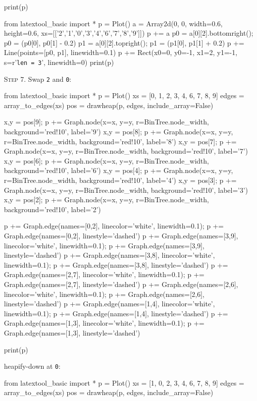 print(p)

from latextool_basic import *
p = Plot()
a = Array2d(0, 0, width=0.6, height=0.6, 
             xs=[['2','1','0','3','4','6','7','8','9']])
p += a
p0 = a[0][2].bottomright(); p0 = (p0[0], p0[1] - 0.2)
p1 = a[0][2].topright(); p1 = (p1[0], p1[1] + 0.2)
p += Line(points=[p0, p1], linewidth=0.1)
p += Rect(x0=0, y0=-1, x1=2, y1=-1, s=r'\texttt{len = 3}', linewidth=0) 
print(p)


\textsc{Step 7}.
Swap \texttt{2} and \texttt{0}:


from latextool_basic import *
p = Plot()
xs = [0, 1, 2, 3, 4, 6, 7, 8, 9]
edges = array_to_edges(xs)
pos = drawheap(p, edges, include_array=False)

x,y = pos[9]; p += Graph.node(x=x, y=y, r=BinTree.node_width, background='red!10', label='9')
x,y = pos[8]; p += Graph.node(x=x, y=y, r=BinTree.node_width, background='red!10', label='8')
x,y = pos[7]; p += Graph.node(x=x, y=y, r=BinTree.node_width, background='red!10', label='7')
x,y = pos[6]; p += Graph.node(x=x, y=y, r=BinTree.node_width, background='red!10', label='6')
x,y = pos[4]; p += Graph.node(x=x, y=y, r=BinTree.node_width, background='red!10', label='4')
x,y = pos[3]; p += Graph.node(x=x, y=y, r=BinTree.node_width, background='red!10', label='3')
x,y = pos[2]; p += Graph.node(x=x, y=y, r=BinTree.node_width, background='red!10', label='2')

p += Graph.edge(names=[0,2], linecolor='white', linewidth=0.1); p += Graph.edge(names=[0,2], linestyle='dashed')
p += Graph.edge(names=[3,9], linecolor='white', linewidth=0.1); p += Graph.edge(names=[3,9], linestyle='dashed')
p += Graph.edge(names=[3,8], linecolor='white', linewidth=0.1); p += Graph.edge(names=[3,8], linestyle='dashed')
p += Graph.edge(names=[2,7], linecolor='white', linewidth=0.1); p += Graph.edge(names=[2,7], linestyle='dashed')
p += Graph.edge(names=[2,6], linecolor='white', linewidth=0.1); p += Graph.edge(names=[2,6], linestyle='dashed')
p += Graph.edge(names=[1,4], linecolor='white', linewidth=0.1); p += Graph.edge(names=[1,4], linestyle='dashed')
p += Graph.edge(names=[1,3], linecolor='white', linewidth=0.1); p += Graph.edge(names=[1,3], linestyle='dashed')

print(p)

heapify-down at \texttt{0}:


from latextool_basic import *
p = Plot()
xs = [1, 0, 2, 3, 4, 6, 7, 8, 9]
edges = array_to_edges(xs)
pos = drawheap(p, edges, include_array=False)

